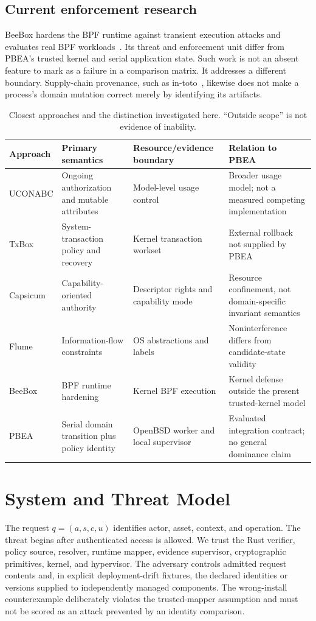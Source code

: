 \documentclass[electronics,article,submit,pdftex,moreauthors]{Definitions/mdpi}
\begin{document}
\subsection{Current enforcement research}
BeeBox hardens the BPF runtime against transient execution attacks and evaluates real BPF workloads~\cite{jin2024beebox}. Its threat and enforcement unit differ from PBEA's trusted kernel and serial application state. Such work is not an absent feature to mark as a failure in a comparison matrix. It addresses a different boundary. Supply-chain provenance, such as in-toto~\cite{torresarias2019intoto}, likewise does not make a process's domain mutation correct merely by identifying its artifacts.

\begin{table}[H]\caption{Closest approaches and the distinction investigated here. ``Outside scope'' is not evidence of inability.}\label{tab:related}
\begin{tabularx}{\textwidth}{lYYY}
\toprule Approach & Primary semantics & Resource/evidence boundary & Relation to PBEA\\\midrule
UCONABC & Ongoing authorization and mutable attributes & Model-level usage control & Broader usage model; not a measured competing implementation\\
TxBox & System-transaction policy and recovery & Kernel transaction workset & External rollback not supplied by PBEA\\
Capsicum & Capability-oriented authority & Descriptor rights and capability mode & Resource confinement, not domain-specific invariant semantics\\
Flume & Information-flow constraints & OS abstractions and labels & Noninterference differs from candidate-state validity\\
BeeBox & BPF runtime hardening & Kernel BPF execution & Kernel defense outside the present trusted-kernel model\\
PBEA & Serial domain transition plus policy identity & OpenBSD worker and local supervisor & Evaluated integration contract; no general dominance claim\\\bottomrule
\end{tabularx}\end{table}

\section{System and Threat Model}\label{sec:model}
The request $q=(a,s,c,u)$ identifies actor, asset, context, and operation. The threat begins after authenticated access is allowed. We trust the Rust verifier, policy source, resolver, runtime mapper, evidence supervisor, cryptographic primitives, kernel, and hypervisor. The adversary controls admitted request contents and, in explicit deployment-drift fixtures, the declared identities or versions supplied to independently managed components. The wrong-install counterexample deliberately violates the trusted-mapper assumption and must not be scored as an attack prevented by an identity comparison.
\end{document}
